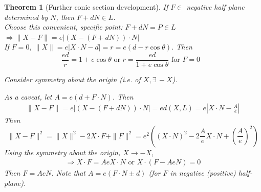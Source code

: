 \documentclass[10pt]{amsart}
\newtheorem{theorem}{Theorem}
\begin{document}
\begin{multicols*}{2}
\begin{theorem}[Further conic section development]
	If $F \in $ negative half plane determined by $N$, then $F + dN \in L$. \\
	
Choose this convenient, specific point: $ F + dN = P \in L$ \quad \, $\Longrightarrow \| X - F \| = e |(X - (F + dN))\cdot N |$ \\

If $F = 0$, $\| X \| = e| X\cdot N - d | = r = e(d - r\cos{\theta})$. Then
\begin{equation}\label{Eq:ConicSectionEqWithCenterAtFocus}
\frac{ed}{r} = 1 + e \cos{\theta} \text{ or } \boxed{ r = \frac{ed }{ 1 + e\cos{\theta}} } \text{ for $F = 0$ }
\end{equation}	

Consider symmetry about the origin (i.e. of $X, \exists \, -X$). 

As a caveat, let $A = e(d + F\cdot N)$. Then
\[
\begin{gathered}
	\| X - F \| = e | (X - (F + dN )) \cdot N | = e d(X, L) = e | X \cdot N - \frac{A}{e} | 
\end{gathered}
\]
Then
\begin{equation}\label{Eq:ConicSectionDistanceFromFocusSquared}
\| X - F \|^2 = \| X \|^2 - 2 X\cdot F + \| F \|^2 = e^2 ((X\cdot N)^2 - 2 \frac{A}{e} X\cdot N + \left( \frac{A}{e}\right)^2 )
\end{equation}
Using the symmetry about the origin, $X \to -X$, \\
\[
\begin{gathered}
	\Longrightarrow X\cdot F = Ae X\cdot N \text{ or } X \cdot (F - Ae N) = 0
\end{gathered}
\]
Then $F = AeN$. Note that $A = e(F\cdot N \pm d)$ (for $F$ in negative (positive) half-plane). 


\end{theorem}
\end{multicols*}
\end{document}
